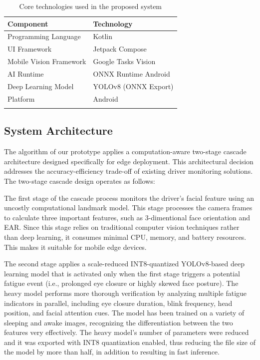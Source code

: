\documentclass[pdflatex,sn-mathphys-num]{sn-jnl}
\theoremstyle{thmstyleone}%
\theoremstyle{thmstyletwo}%
\theoremstyle{thmstylethree}%
\begin{document}
	\begin{table}[h]
		\caption{Core technologies used in the proposed system}\label{tab:techstack}
		\begin{tabular}{@{}ll@{}}
			\toprule
			Component & Technology\\
			\midrule
			Programming Language & Kotlin\\
			UI Framework & Jetpack Compose\\
			Mobile Vision Framework & Google Tasks Vision\\
			AI Runtime & ONNX Runtime Android\\
			Deep Learning Model & YOLOv8 (ONNX Export)\\
			Platform & Android\\
			\botrule
		\end{tabular}
	\end{table}
	
	\subsection{System Architecture}\label{sec:arch}
	
	The algorithm of our prototype applies a computation-aware two-stage cascade architecture designed specifically for edge deployment. This architectural decision addresses the accuracy-efficiency trade-off of existing driver monitoring solutions. The two-stage cascade design operates as follows:
	
	
	The first stage of the cascade process monitors the driver’s facial feature using an uncostly computational landmark model. This stage processes the camera frames to calculate three important features, such as 3-dimentional face orientation and EAR. Since this stage relies on traditional computer vision techniques rather than deep learning, it consumes minimal CPU, memory, and battery resources. This makes it suitable for mobile edge devices.
	
	
	
	The second stage applies a scale-reduced INT8-quantized YOLOv8-based deep learning model that is activated only when the first stage triggers a potential fatigue event (i.e., prolonged eye closure or highly skewed face posture). The heavy model performs more thorough verification by analyzing multiple fatigue indicators in parallel, including eye closure duration, blink frequency, head position, and facial attention cues. The model has been trained on a variety of sleeping and awake images, recognizing the differentiation between the two features very effectively. The heavy model's number of parameters were reduced and it was exported with INT8 quantization enabled, thus reducing the file size of the model by more than half, in addition to resulting in fast inference.
	
\end{document}
